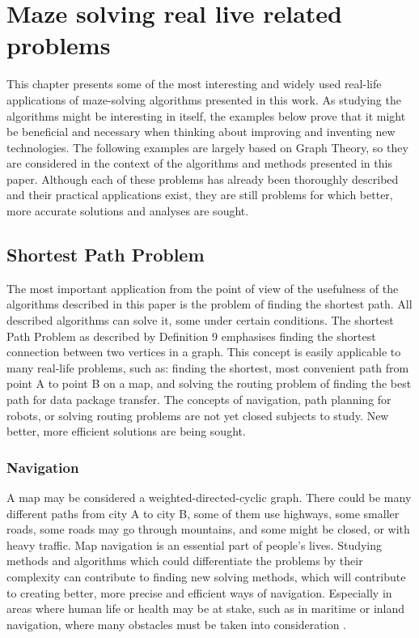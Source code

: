 \chapter{Maze solving real live related problems}\label{cha:background}
This chapter presents some of the most interesting and widely used real-life applications of maze-solving algorithms presented in this work. 
As studying the algorithms might be interesting in itself, the examples below prove that it might be beneficial and necessary when thinking about 
improving and inventing new technologies. The following examples are largely based on Graph Theory, so they are considered in the context of 
the algorithms and methods presented in this paper. Although each of these problems has already been thoroughly described and their practical 
applications exist, they are still problems for which better, more accurate solutions and analyses are sought.
\section{Shortest Path Problem}
The most important application from the point of view of the usefulness of the algorithms described in this paper is the problem of finding the shortest path.
All described algorithms can solve it, some under certain conditions. The shortest Path Problem as described by Definition 9 emphasises
finding the shortest connection between two vertices in a graph. This concept is easily applicable to many real-life problems, such as: finding the shortest, most
convenient path from point A to point B on a map, and solving the routing problem of finding the best path for data package transfer. The concepts of navigation, 
path planning for robots, or solving routing problems are not yet closed subjects to study. New better, more efficient solutions are being sought. 
\subsection{Navigation}
A map may be considered a weighted-directed-cyclic graph. There could be many different paths from city A to city B, some of them use highways, some smaller 
roads, some roads may go through mountains, and some might be closed, or with heavy traffic. Map navigation is an essential part of people's lives. 
Studying methods and algorithms which could differentiate the problems by their complexity can contribute to finding new solving methods, which will contribute 
to creating better, more precise and efficient ways of navigation. Especially in areas where human life or health may be at stake, such as in maritime or inland 
navigation, where many obstacles must be taken into consideration \cite{19}.
